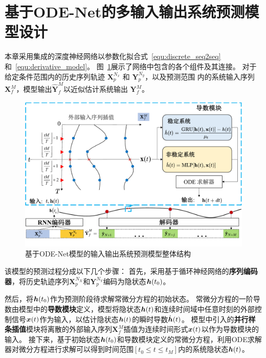 \section{基于ODE-Net的多输入输出系统预测模型设计}
\label{sec:model}
本章采用集成的深度神经网络以参数化拟合式~\eqref{equ:discrete_seq2seq}和~\eqref{equ:derivative_model}。
图~\ref{fig:model_structure}展示了网络中包含的各个组件及其连接。
对于给定条件范围内的历史序列轨迹 $\boldsymbol{X}_{p}^{N_{x}}$ 和 $\boldsymbol{Y}_{p}^{N_{y}}$，以及预测范围 内的系统输入序列$\boldsymbol{X}_{f}^{M}$，模型输出$\hat{\boldsymbol{Y}}_{f}^{M}$以近似估计系统输出 $\boldsymbol{Y}_{f}^{M}$。
\begin{figure}[t]
    \centering
    \includegraphics[width=1.0\linewidth]{figures/chapter3/model.pdf}
    \caption{
    基于ODE-Net模型的输入输出系统预测模型整体结构
    }
    \label{fig:model_structure}
\end{figure}
该模型的预测过程分成以下几个步骤：
首先，采用基于循环神经网络的\textbf{序列编码器}，将历史轨迹序列$\boldsymbol{X}_{p}^{N_{X}}$和$\boldsymbol{Y}_{p}^{N_{Y}}$编码为隐状态$\boldsymbol h(t_0)$。

然后，将$\boldsymbol h(t_0)$作为预测阶段待求解常微分方程的初始状态。
常微分方程的一阶导数由模型中的\textbf{导数模块}定义，模型将隐状态$\boldsymbol h(t)$和连续时间域中任意时刻的外部控制信号$\boldsymbol x(t)$作为输入，以估计隐状态$\boldsymbol h(t)$的瞬时导数$\dot{\boldsymbol h}(t)$。
模型中引入的\textbf{并行样条插值}模块将离散的外部输入序列$\boldsymbol{X}_{f}^{M}$插值为连续时间形式$\boldsymbol x(t)$以作为导数模块的输入。
接下来，基于初始状态$\boldsymbol h(t_0)$和导数模块定义的常微分方程，利用ODE求解器对微分方程进行求解可以得到时间范围$[t_0\leq t \leq t_M]$内的系统隐状态$\boldsymbol h(t)$。

